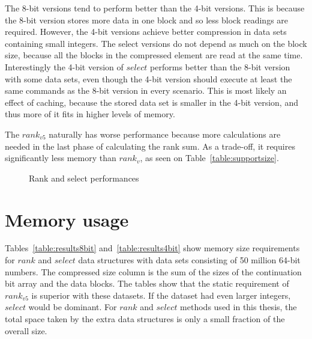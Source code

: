 The 8-bit versions tend to perform better than the 4-bit versions. This is because the 8-bit version stores more data in one block and so less block readings are required. However, the 4-bit versions achieve 
better compression in data sets containing small integers. The select versions do not depend as much on the block size, because all the blocks in the compressed element are read at the same time. 
Interestingly the 4-bit version of $select$ performs better than the 8-bit version with some data sets, even though the 4-bit version should execute at least the same commands as the 8-bit version 
in every scenario. This is most likely an effect of caching, because the stored data set is smaller in the 4-bit version, and thus more of it fits in higher levels of memory.

The $rank_{v5}$ naturally has worse performance because more calculations are needed in the last phase of calculating the rank sum. As a trade-off, it requires 
significantly less memory than $rank_v$, as seen on Table~\ref{table:supportsize}.

\begin{figure}[ht]
\centering
{}
\caption{Rank and select performances} \label{graph:data_comparison}
\end{figure}

\section{Memory usage}
Tables~\ref{table:results8bit} and~\ref{table:results4bit} show memory size requirements for $rank$ and $select$ data structures with data sets consisting
 of 50 million 64-bit numbers. The compressed size column is the sum of the sizes of the continuation bit array and the data blocks. The tables show that the static requirement of $rank_{v5}$ is superior with these datasets.
If the dataset had even larger integers, $select$ would be dominant. For $rank$ and $select$ methods used in this thesis, the total 
space taken by the extra data structures is only a small fraction of the overall size. 

